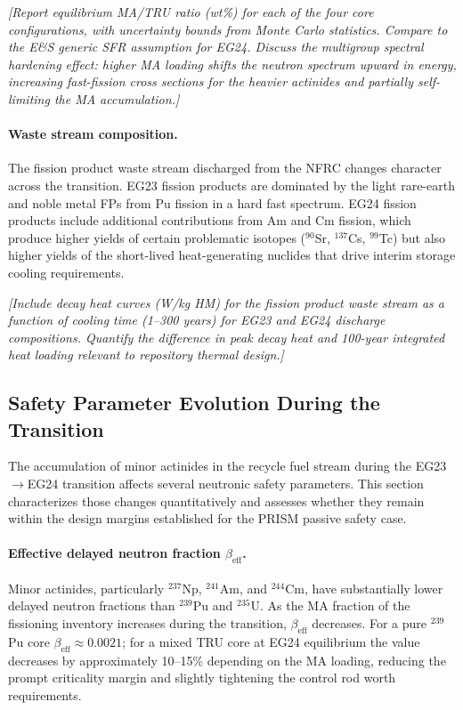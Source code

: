 \documentclass[10pt,twoside]{article}
\newcommand{\placeholder}[1]{%
  \textcolor{placeholder}{\textit{[#1]}}}
\begin{document}
\placeholder{Report equilibrium MA/TRU ratio (wt\%) for each
  of the four core configurations, with uncertainty bounds from
  Monte Carlo statistics.  Compare to the E\&S generic SFR
  assumption for EG24.  Discuss the multigroup spectral hardening
  effect: higher MA loading shifts the neutron spectrum upward in
  energy, increasing fast-fission cross sections for the heavier
  actinides and partially self-limiting the MA accumulation.}

\paragraph{Waste stream composition.}
The fission product waste stream discharged from the NFRC changes
character across the transition.  EG23 fission products are
dominated by the light rare-earth and noble metal FPs from Pu
fission in a hard fast spectrum.  EG24 fission products include
additional contributions from Am and Cm fission, which produce
higher yields of certain problematic isotopes ($^{90}$Sr,
$^{137}$Cs, $^{99}$Tc) but also higher yields of the short-lived
heat-generating nuclides that drive interim storage cooling
requirements.

\placeholder{Include decay heat curves (W/kg HM) for the
  fission product waste stream as a function of cooling time
  (1--300 years) for EG23 and EG24 discharge compositions.
  Quantify the difference in peak decay heat and 100-year
  integrated heat loading relevant to repository thermal design.}

\subsection{Safety Parameter Evolution During the Transition}
\label{sec:safety_transition}

The accumulation of minor actinides in the recycle fuel stream
during the EG23$\rightarrow$EG24 transition affects several
neutronic safety parameters.  This section characterizes those
changes quantitatively and assesses whether they remain within
the design margins established for the PRISM passive safety
case.\cite{NRC1994,Till2011}

\paragraph{Effective delayed neutron fraction $\beta_\text{eff}$.}
Minor actinides, particularly $^{237}$Np, $^{241}$Am, and
$^{244}$Cm, have substantially lower delayed neutron fractions
than $^{239}$Pu and $^{235}$U.  As the MA fraction of the
fissioning inventory increases during the transition, $\beta_\text{eff}$
decreases.  For a pure $^{239}$Pu core $\beta_\text{eff} \approx 0.0021$;
for a mixed TRU core at EG24 equilibrium the value decreases by
approximately 10--15\% depending on the MA loading, reducing the
prompt criticality margin and slightly tightening the control rod
worth requirements.
\end{document}
